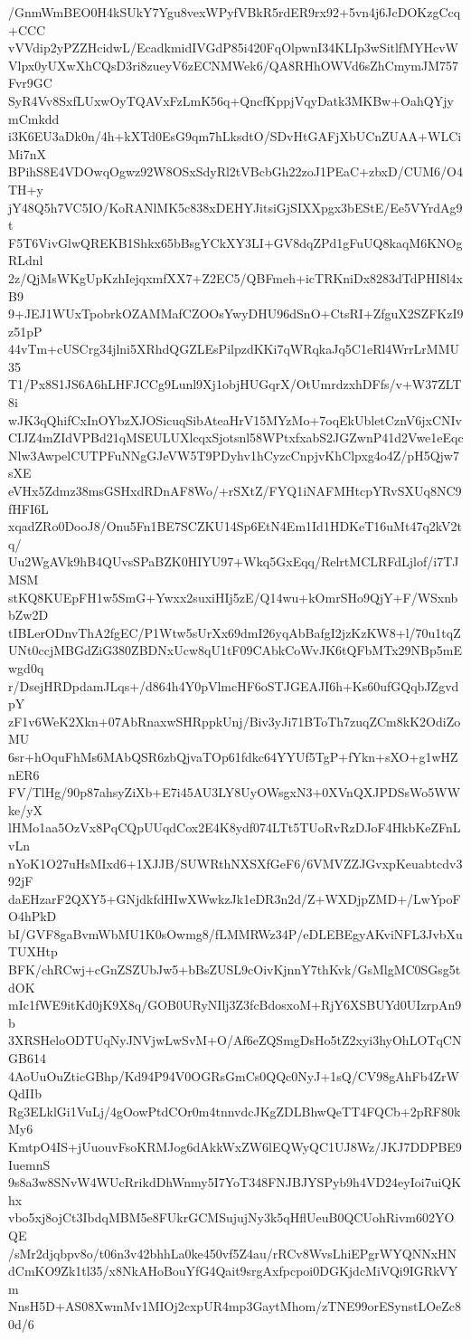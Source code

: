 /GnmWmBEO0H4kSUkY7Ygu8vexWPyfVBkR5rdER9rx92+5vn4j6JcDOKzgCcq+CCC
vVVdip2yPZZHcidwL/EcadkmidIVGdP85i420FqOlpwnI34KLIp3wSitlfMYHcvW
Vlpx0yUXwXhCQsD3ri8zueyV6zECNMWek6/QA8RHhOWVd6sZhCmymJM757Fvr9GC
SyR4Vv8SxfLUxwOyTQAVxFzLmK56q+QncfKppjVqyDatk3MKBw+OahQYjymCmkdd
i3K6EU3aDk0n/4h+kXTd0EsG9qm7hLksdtO/SDvHtGAFjXbUCnZUAA+WLCiMi7nX
BPihS8E4VDOwqOgwz92W8OSxSdyRl2tVBcbGh22zoJ1PEaC+zbxD/CUM6/O4TH+y
jY48Q5h7VC5IO/KoRANlMK5c838xDEHYJitsiGjSIXXpgx3bEStE/Ee5VYrdAg9t
F5T6VivGlwQREKB1Shkx65bBsgYCkXY3LI+GV8dqZPd1gFuUQ8kaqM6KNOgRLdnl
2z/QjMsWKgUpKzhIejqxmfXX7+Z2EC5/QBFmeh+icTRKniDx8283dTdPHI8l4xB9
9+JEJ1WUxTpobrkOZAMMafCZOOsYwyDHU96dSnO+CtsRI+ZfguX2SZFKzI9z51pP
44vTm+cUSCrg34jlni5XRhdQGZLEsPilpzdKKi7qWRqkaJq5C1eRl4WrrLrMMU35
T1/Px8S1JS6A6hLHFJCCg9Lunl9Xj1objHUGqrX/OtUmrdzxhDFfs/v+W37ZLT8i
wJK3qQhifCxInOYbzXJOSicuqSibAteaHrV15MYzMo+7oqEkUbletCznV6jxCNIv
CIJZ4mZIdVPBd21qMSEULUXlcqxSjotsnl58WPtxfxabS2JGZwnP41d2Vwe1eEqc
Nlw3AwpelCUTPFuNNgGJeVW5T9PDyhv1hCyzcCnpjvKhClpxg4o4Z/pH5Qjw7sXE
eVHx5Zdmz38msGSHxdRDnAF8Wo/+rSXtZ/FYQ1iNAFMHtcpYRvSXUq8NC9fHFI6L
xqadZRo0DooJ8/Onu5Fn1BE7SCZKU14Sp6EtN4Em1Id1HDKeT16uMt47q2kV2tq/
Uu2WgAVk9hB4QUvsSPaBZK0HIYU97+Wkq5GxEqq/RelrtMCLRFdLjlof/i7TJMSM
stKQ8KUEpFH1w5SmG+Ywxx2suxiHIj5zE/Q14wu+kOmrSHo9QjY+F/WSxnbbZw2D
tIBLerODnvThA2fgEC/P1Wtw5sUrXx69dmI26yqAbBafgI2jzKzKW8+l/70u1tqZ
UNt0ccjMBGdZiG380ZBDNxUcw8qU1tF09CAbkCoWvJK6tQFbMTx29NBp5mEwgd0q
r/DsejHRDpdamJLqs+/d864h4Y0pVlmcHF6oSTJGEAJI6h+Ks60ufGQqbJZgvdpY
zF1v6WeK2Xkn+07AbRnaxwSHRppkUnj/Biv3yJi71BToTh7zuqZCm8kK2OdiZoMU
6sr+hOquFhMs6MAbQSR6zbQjvaTOp61fdkc64YYUf5TgP+fYkn+sXO+g1wHZnER6
FV/TlHg/90p87ahsyZiXb+E7i45AU3LY8UyOWsgxN3+0XVnQXJPDSsWo5WWke/yX
lHMo1aa5OzVx8PqCQpUUqdCox2E4K8ydf074LTt5TUoRvRzDJoF4HkbKeZFnLvLn
nYoK1O27uHsMIxd6+1XJJB/SUWRthNXSXfGeF6/6VMVZZJGvxpKeuabtcdv392jF
daEHzarF2QXY5+GNjdkfdHIwXWwkzJk1eDR3n2d/Z+WXDjpZMD+/LwYpoFO4hPkD
bI/GVF8gaBvmWbMU1K0sOwmg8/fLMMRWz34P/eDLEBEgyAKviNFL3JvbXuTUXHtp
BFK/chRCwj+cGnZSZUbJw5+bBsZUSL9cOivKjnnY7thKvk/GsMlgMC0SGsg5tdOK
mIc1fWE9itKd0jK9X8q/GOB0URyNIlj3Z3fcBdosxoM+RjY6XSBUYd0UIzrpAn9b
3XRSHeloODTUqNyJNVjwLwSvM+O/Af6eZQSmgDsHo5tZ2xyi3hyOhLOTqCNGB614
4AoUuOuZticGBhp/Kd94P94V0OGRsGmCs0QQc0NyJ+1sQ/CV98gAhFb4ZrWQdIIb
Rg3ELklGi1VuLj/4gOowPtdCOr0m4tnnvdcJKgZDLBhwQeTT4FQCb+2pRF80kMy6
KmtpO4IS+jUuouvFsoKRMJog6dAkkWxZW6lEQWyQC1UJ8Wz/JKJ7DDPBE9IuemnS
9s8a3w8SNvW4WUcRrikdDhWnmy5I7YoT348FNJBJYSPyb9h4VD24eyIoi7uiQKhx
vbo5xj8ojCt3IbdqMBM5e8FUkrGCMSujujNy3k5qHflUeuB0QCUohRivm602YOQE
/sMr2djqbpv8o/t06n3v42bhhLa0ke450vf5Z4au/rRCv8WvsLhiEPgrWYQNNxHN
dCmKO9Zk1tl35/x8NkAHoBouYfG4Qait9srgAxfpcpoi0DGKjdcMiVQi9IGRkVYm
NnsH5D+AS08XwmMv1MIOj2cxpUR4mp3GaytMhom/zTNE99orESynstLOeZc80d/6
